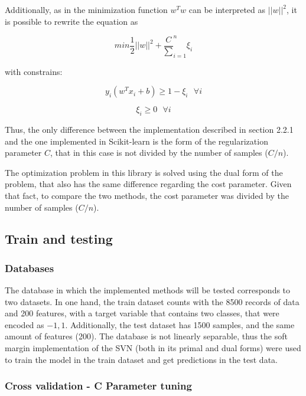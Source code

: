 \documentclass[11pt,twocolumn,letterpaper]{article}
\begin{document}
Additionally, as in the minimization function $w^T w$ can be interpreted as  $||w||^2$, it is possible to rewrite the equation as 

\begin{equation}
	min \frac{1}{2}||w||^2 + \frac{C}\sum^n_{i=1}\xi_i
\end{equation}

with constrains:

\begin{equation}
	y_i(w^T x_i + b) \geq 1 - \xi_i \:\:\:\forall i
\end{equation}

\begin{equation}
	\xi_i  \geq 0 \:\:\: \forall i
\end{equation}

Thus, the only difference between the implementation described in section 2.2.1 and the one implemented in Scikit-learn is the form of the regularization parameter $C$, that in this case is not divided by the number of samples ($C/n$).  

The optimization problem in this library is solved using the dual form of the problem, that also has the same difference regarding the cost parameter. Given that fact, to compare the two methods, the cost parameter was divided by the number of samples ($C/n$).

\subsection{Train and testing}

\subsubsection{Databases}

The database in which the implemented methods will be tested corresponds to two datasets. In one hand, the train dataset counts with the 8500 records of data and 200 features, with a target variable that contains two classes, that were encoded as ${-1,1}$. Additionally, the test dataset has 1500 samples, and the same amount of features (200). The database is not linearly separable, thus the soft margin implementation of the SVN (both in its primal and dual forms) were used to train the model in the train dataset and get predictions in the test data.

\subsubsection{Cross validation - C Parameter tuning}
\end{document}
